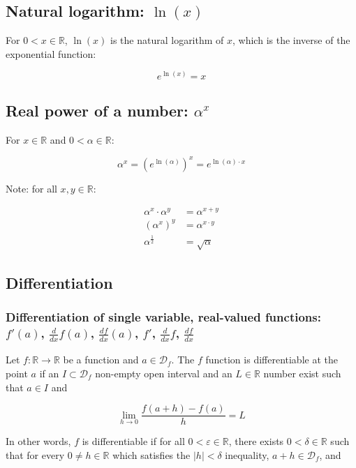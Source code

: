 \documentclass[titlepage]{article}
\begin{document}
      \subsection{Natural logarithm: $\ln(x)$}

        For $0 < x \in \mathbb{R}$, $\ln(x)$ is the natural logarithm of $x$,
        which is the inverse of the exponential function:

        $$e^{\ln(x)} = x$$

      \subsection{Real power of a number: $\alpha^x$}

        For $x \in \mathbb{R}$ and $0 < \alpha \in \mathbb{R}$:

        $$
          \alpha^x = \left( e^{\ln(\alpha)} \right)^x = e^{\ln(\alpha) \cdot x}
        $$

        Note: for all $x, y \in \mathbb{R}$:

        \begin{align*}
          \alpha^x \cdot \alpha^y & = \alpha^{x+y} \\
          \left( \alpha^x \right)^y & = \alpha^{x \cdot y} \\
          \alpha^\frac{1}{2} & = \sqrt{\alpha}
        \end{align*}

      \subsection{Differentiation}

        \subsubsection{%
          Differentiation of single variable, real-valued functions:
          $f'(a)$, $\frac{d}{dx}f(a)$, $\frac{df}{dx}(a)$,
          $f'$, $\frac{d}{dx}f$, $\frac{df}{dx}$
        }

          Let $f : \mathbb{R} \rightarrow \mathbb{R}$ be a function and
          $a \in \mathcal{D}_f$. The $f$ function is differentiable at the point
          $a$ if an $I \subset \mathcal{D}_f$ non-empty open interval and an
          $L \in \mathbb{R}$ number exist such that $a \in I$ and

          $$
            \lim_{h \to 0} \frac{f(a+h) - f(a)}{h} = L
          $$

          In other words, $f$ is differentiable if for all
          $0 < \varepsilon \in \mathbb{R}$, there exists
          $0 < \delta \in \mathbb{R}$ such that for every
          $0 \neq h \in \mathbb{R}$ which satisfies the $|h| < \delta$
          inequality, $a+h \in \mathcal{D}_f$, and
\end{document}
